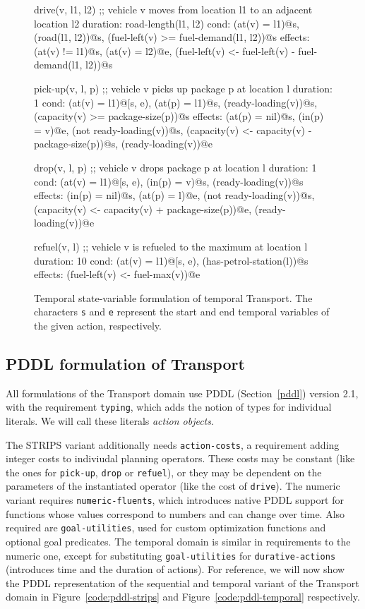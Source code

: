 \begin{figure}[tb]
\begin{code}
drive(v, l1, l2)
  ;; vehicle v moves from location l1 to an adjacent location l2
  duration: road-length(l1, l2)
  cond: (at(v) = l1)@s, (road(l1, l2))@s,
        (fuel-left(v) >= fuel-demand(l1, l2))@s
  effects: (at(v) != l1)@s, (at(v) = l2)@e,
           (fuel-left(v) <- fuel-left(v) - fuel-demand(l1, l2))@s

pick-up(v, l, p)
  ;; vehicle v picks up package p at location l
  duration: 1
  cond: (at(v) = l1)@[s, e), (at(p) = l1)@s, (ready-loading(v))@s,
        (capacity(v) >= package-size(p))@s
  effects: (at(p) = nil)@s, (in(p) = v)@e, (not ready-loading(v))@s,
           (capacity(v) <- capacity(v) - package-size(p))@s,
           (ready-loading(v))@e
  
drop(v, l, p)
  ;; vehicle v drops package p at location l
  duration: 1
  cond: (at(v) = l1)@[s, e), (in(p) = v)@s, (ready-loading(v))@s
  effects: (in(p) = nil)@s, (at(p) = l)@e, (not ready-loading(v))@s,
           (capacity(v) <- capacity(v) + package-size(p))@e,
           (ready-loading(v))@e
  
refuel(v, l)
  ;; vehicle v is refueled to the maximum at location l
  duration: 10
  cond: (at(v) = l1)@[s, e), (has-petrol-station(l))@s
  effects: (fuel-left(v) <- fuel-max(v))@e
\end{code}
\caption[State-variable formulation of temporal Transport.]{Temporal state-variable formulation of temporal Transport. The characters \texttt{s} and \texttt{e} represent the start and end temporal variables of the given action, respectively.}
\label{code:statevar-temporal}
\end{figure}

\subsection{PDDL formulation of Transport}

All formulations of the Transport domain use PDDL (Section~\ref{pddl}) version 2.1,
with the requirement \verb+typing+, which adds the notion of types for individual
literals. We will call these literals \textit{action objects}.

The STRIPS variant additionally needs \verb+action-costs+, a requirement adding
integer costs to indiviudal planning operators. These costs may be constant
(like the ones for \verb+pick-up+, \verb+drop+ or \verb+refuel+),
or they may be dependent on the parameters of the instantiated operator (like
the cost of \verb+drive+).
The numeric variant
requires \verb+numeric-fluents+, which introduces native PDDL support for functions whose values correspond to numbers and can change over time. Also required are
\verb+goal-utilities+, used for custom optimization functions and optional goal predicates.
The temporal domain is similar in requirements to the numeric one, except for
substituting \verb+goal-utilities+ for \verb+durative-actions+ (introduces time
and the duration of actions).
For reference, we will now show the PDDL representation of the sequential and temporal variant of
the Transport domain in Figure~\ref{code:pddl-strips} and Figure~\ref{code:pddl-temporal} respectively.

